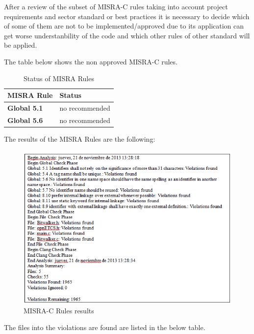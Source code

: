 After a review of the subset of MISRA-C rules taking into account project requirements and sector standard or best practices it is necessary to decide which of some of them are not to be implemented/approved due to its application can get worse understanbility of the code and which other rules of other standard will be applied.

The table below shows the non approved MISRA-C rules.

{\footnotesize\sffamily\centering
  \begin{longtable}{||p{}|p{}||}
  \caption{Status of MISRA Rules}\\
    \hline\hline
    \textbf{MISRA Rule} & \textbf{Status} \\
    \hline\hline
    \endhead
    \hline\hline
    \endfoot
    \textbf{Global 5.1}
& no recommended
    \\
    \hline
    \textbf{Global 5.6}
& no recommended
    \\
    \hline
\end{longtable}}


The results of the MISRA Rules are the following:
\begin{figure}[H]
\centering
\includegraphics{./figures/understand.png}
\caption{MISRA-C Rules results}
\end{figure}

The files into the violations are found are listed in the below table.


